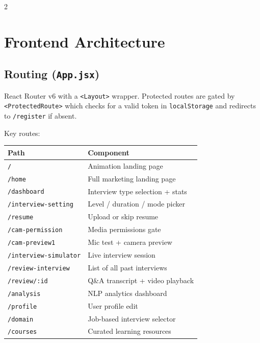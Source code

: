 \documentclass[10pt, a4paper]{article}
\begin{document}
\begin{multicols}{2}
\section{Frontend Architecture}

\subsection{Routing (\texttt{App.jsx})}
React Router v6 with a \texttt{<Layout>} wrapper. Protected routes are
gated by \texttt{<ProtectedRoute>} which checks for a valid token in
\texttt{localStorage} and redirects to \texttt{/register} if absent.

Key routes:
\begin{center}
\scriptsize
\begin{tabular}{@{}ll@{}}
\toprule
Path & Component \\
\midrule
\texttt{/} & Animation landing page \\
\texttt{/home} & Full marketing landing page \\
\texttt{/dashboard} & Interview type selection + stats \\
\texttt{/interview-setting} & Level / duration / mode picker \\
\texttt{/resume} & Upload or skip resume \\
\texttt{/cam-permission} & Media permissions gate \\
\texttt{/cam-preview1} & Mic test + camera preview \\
\texttt{/interview-simulator} & Live interview session \\
\texttt{/review-interview} & List of all past interviews \\
\texttt{/review/:id} & Q\&A transcript + video playback \\
\texttt{/analysis} & NLP analytics dashboard \\
\texttt{/profile} & User profile edit \\
\texttt{/domain} & Job-based interview selector \\
\texttt{/courses} & Curated learning resources \\
\bottomrule
\end{tabular}
\end{center}


\end{multicols}
\end{document}
